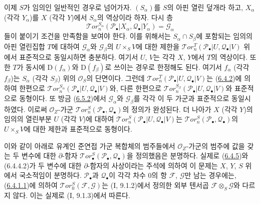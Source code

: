 \begin{env}[6.5.3]
\label{III.6.5.3-fr}
이제 $S$가 임의인 일반적인 경우로 넘어가자. $(S_\alpha)$를 $S$의
아핀 열린 덮개라 하고, $X_\alpha$ (각각 $Y_\alpha$)를 $X$ (각각
$Y$)에서 $S_\alpha$의 역상이라 하자. 다시 층
\[
  \mathscr{T}\!or_n^{S_\alpha}
  (\mathscr P_\bullet|X_\alpha,\mathscr Q_\bullet|Y_\alpha)
  =\mathscr G_\alpha
\]
들이 붙이기 조건을 만족함을 보여야 한다. 이를 위해서는
$S_\alpha\cap S_\beta$에 포함되는 임의의 아핀 열린집합 $T$에 대하여
$\mathscr G_\alpha$와 $\mathscr G_\beta$의 $U\times_S V$에 대한 제한을
$\mathscr{T}\!or_n^T(\mathscr P_\bullet|U,\mathscr Q_\bullet|V)$ 위에서
표준적으로 동일시하면 충분하다. 여기서 $U$, $V$는 각각 $X$, $Y$에서
$T$의 역상이다. 또한 $T$가 동시에 $\mathrm D(f_\alpha)$와
$\mathrm D(f_\beta)$로 쓰이는 경우로 한정해도 된다. 여기서
$f_\alpha$ (각각 $f_\beta$)는 $S_\alpha$ (각각 $S_\beta$) 위의
$\mathscr O_S$의 단면이다. 그런데
$\mathscr{T}\!or_n^T(\mathscr P_\bullet|U,\mathscr Q_\bullet|V)$는
(\hyperref[III.6.4.2-fr]{6.4.2})에 의하여 한편으로
$\mathscr{T}\!or_n^{S_\alpha}(\mathscr P_\bullet|U,
\mathscr Q_\bullet|V)$와, 다른 한편으로
$\mathscr{T}\!or_n^{S_\beta}(\mathscr P_\bullet|U,
\mathscr Q_\bullet|V)$와 표준적으로 동형이다. 또 방금
(\hyperref[III.6.5.2-fr]{6.5.2})에서 $\mathscr G_\alpha$와
$\mathscr G_\beta$를 각각 이 두 가군과 표준적으로 동일시하였다.
이로써 $\mathscr O_Z$-가군
$\mathscr{T}\!or_n^S(\mathscr P_\bullet,\mathscr Q_\bullet)$의 정의가
완성된다. 더 나아가 $X$ (각각 $Y$)의 임의의 열린부분 $U$ (각각
$V$)에 대하여
$\mathscr{T}\!or_n^S(\mathscr P_\bullet|U,\mathscr Q_\bullet|V)$는
$\mathscr{T}\!or_n^S(\mathscr P_\bullet,\mathscr Q_\bullet)$의
$U\times_S V$에 대한 제한과 표준적으로 동형이다.

이와 같이 아래로 유계인 준연접 가군 복합체의 범주들에서
$\mathscr O_Z$-가군의 범주에 값을 갖는 두 변수에 대한 $\partial$-함자
$\mathscr{T}\!or_\bullet^S(\mathscr P_\bullet,\mathscr Q_\bullet)$을
정의했음은 분명하다. 실제로
(\hyperref[III.6.4.5-fr]{6.4.5})와 (6.4.4.2)가 두 변수에 대한
$\partial$-함자의 사상이라는 주석에 의하여 이 문제는 $X$, $Y$, $S$
위에서 국소적임이 분명하다. $\mathscr P_\bullet$과
$\mathscr Q_\bullet$이 각각 차수 0의 항 $\mathscr F$, $\mathscr G$만
남는 경우에는, (\hyperref[III.6.4.1.1.fr]{6.4.1.1})에 의하여
$\mathscr{T}\!or_0^S(\mathscr F,\mathscr G)$는
(I, 9.1.2)에서 정의한 외부 텐서곱
$\mathscr F\otimes_S\mathscr G$와 다르지 않다. 이는 실제로
(I, 9.1.3)에서 따른다.
\end{env}


